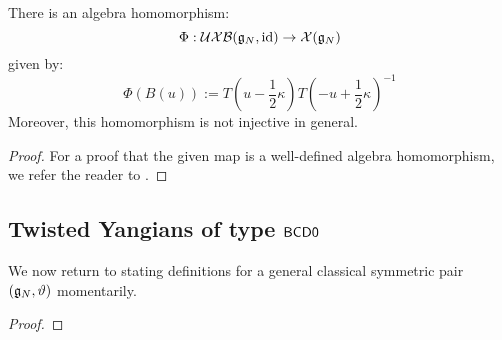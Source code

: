             \begin{proposition} \label{prop: mapping_IMO_reflection_algebras_to_extended_yangians}
                There is an algebra homomorphism:
                    \begin{equation} \label{equation: mapping_IMO_reflection_algebras_to_extended_yangians}
                        \Phi: \mathcal{UXB}(\mathfrak{g}_N, \mathrm{id}) \to \mathcal{X}(\mathfrak{g}_N)
                    \end{equation}
                given by:
                    $$\Phi(B(u)) := T\left(u - \frac12 \kappa\right) T\left(-u + \frac12 \kappa\right)^{-1}$$
                Moreover, this homomorphism is not injective in general.
            \end{proposition}
                \begin{proof}
                    For a proof that the given map is a well-defined algebra homomorphism, we refer the reader to \cite[Proposition 3.2]{isaev_molev_ogievetsky_fusion_for_brauer_algebras_2}. 
                \end{proof}

        \subsection{Twisted Yangians of type \texorpdfstring{$\mathsf{B}\mathsf{C}\mathsf{D}\mathsf{0}$}{}}
            We now return to stating definitions for a general classical symmetric pair $(\mathfrak{g}_N, \vartheta)$ momentarily.
            \begin{definition} \label{def: (extended)_twisted_yangians_associated_to_symmetric_pairs}
                
            \end{definition}

            \begin{lemma} \label{lemma: twsited_quantum_contractions}
            \end{lemma}
                \begin{proof}
                    
                \end{proof}

